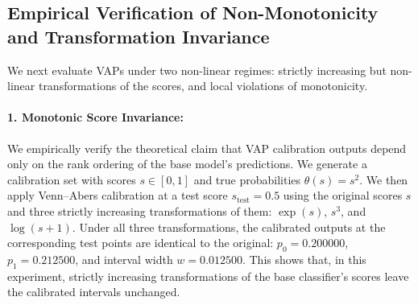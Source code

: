 \documentclass[11pt]{article}
\begin{document}
	\subsection{Empirical Verification of Non-Monotonicity and Transformation Invariance}
	\label{subsec:non_monotonic_results}
	
	We next evaluate VAPs under two non-linear regimes: strictly increasing but non-linear transformations of the scores, and local violations of monotonicity.
	
	\paragraph{1. Monotonic Score Invariance:}
	We empirically verify the theoretical claim that VAP calibration outputs depend only on the rank ordering of the base model's predictions. We generate a calibration set with scores $s \in [0, 1]$ and true probabilities $\theta(s) = s^2$. We then apply Venn--Abers calibration at a test score $s_{\text{test}} = 0.5$ using the original scores $s$ and three strictly increasing transformations of them: $\exp(s)$, $s^3$, and $\log(s+1)$.
	Under all three transformations, the calibrated outputs at the corresponding test points are identical to the original: $p_0 = 0.200000$, $p_1 = 0.212500$, and interval width $w = 0.012500$. This shows that, in this experiment, strictly increasing transformations of the base classifier's scores leave the calibrated intervals unchanged.
	
\end{document}
